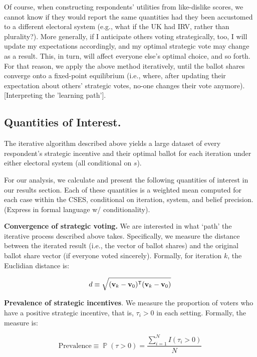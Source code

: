 \documentclass[12pt, letter]{article}
\DeclareMathOperator{\Prob}{\mathbb{P}}
\newcommand*{\trans}{^{\mathsf{T}}} %
\begin{document}
Of course, when constructing respondents' utilities from like-dislike scores, we cannot know if they would report the same quantities had they been accustomed to a different electoral system (e.g., what if the UK had IRV, rather than plurality?). More generally, if I anticipate others voting strategically, too, I will update my expectations accordingly, and my optimal strategic vote may change as a result. This, in turn, will affect everyone else's optimal choice, and so forth. For that reason, we apply the above method iteratively, until the ballot shares converge onto a fixed-point equilibrium (i.e., where, after updating their expectation about others' strategic votes, no-one changes their vote anymore). [Interpreting the 'learning path'].

\subsection{Quantities of Interest.}
\label{quants}

The iterative algorithm described above yields a large dataset of every respondent's strategic incentive and their optimal ballot for each iteration under either electoral system (all conditional on $s$).

For our analysis, we calculate and present the following quantities of interest in our results section. Each of these quantities is a weighted mean computed for each case within the CSES, conditional on iteration, system, and belief precision. (Express in formal language w/ conditionality).

\textbf{Convergence of strategic voting.} We are interested in what `path' the iterative process described above takes. Specifically, we measure the distance between the iterated result (i.e., the vector of ballot shares) and the original ballot share vector (if everyone voted sincerely). Formally, for iteration $k$, the Euclidian distance is:

\begin{equation}
	d \equiv \sqrt{({\bf v}_k - {\bf v}_0)\trans ({\bf v}_k - {\bf v}_0)}
\end{equation}

\textbf{Prevalence of strategic incentives}. We measure the proportion of voters who have a positive strategic incentive, that is, $\tau_i > 0$ in each setting. Formally, the measure is:

\begin{equation}
	\text{Prevalence} \equiv \Prob(\tau > 0) = \frac{\sum^N_{i = 1} I(\tau_i > 0)}{N}
\end{equation}
\end{document}
